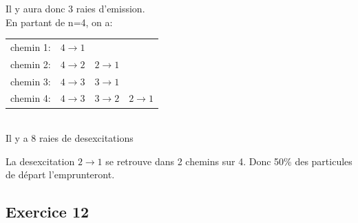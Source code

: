 \documentclass[12pt,french,dvips]{report}
\begin{document}
Il y aura donc 3 raies d'emission.\\
En partant de n=4, on a:\\
\begin{tabular}{llll}
chemin 1: & $4\rightarrow 1$ \\
chemin 2: & $4\rightarrow 2$ & $2\rightarrow 1$ \\
chemin 3: & $4\rightarrow 3$ & $3\rightarrow 1$ \\
chemin 4: & $4\rightarrow 3$ & $3\rightarrow 2$ & $2\rightarrow 1$ \\
\end{tabular}\\
Il y a 8 raies de desexcitations
\item La desexcitation $2\rightarrow 1$ se retrouve dans 2 chemins sur 4.
Donc 50\% des particules de départ l'emprunteront.
\subsection{Exercice 12}
\end{document}
